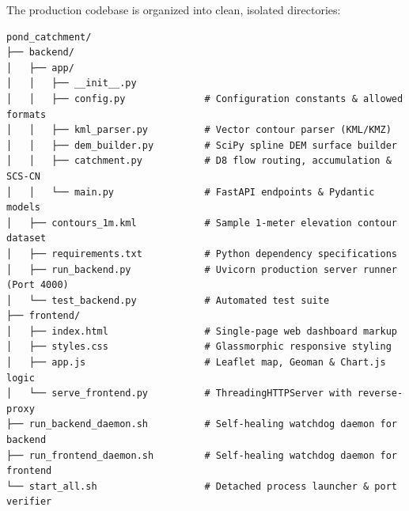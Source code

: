 \documentclass[11pt,a4paper]{article}
\begin{document}
The production codebase is organized into clean, isolated directories:
\begin{lstlisting}
pond_catchment/
├── backend/
│   ├── app/
│   │   ├── __init__.py
│   │   ├── config.py              # Configuration constants & allowed formats
│   │   ├── kml_parser.py          # Vector contour parser (KML/KMZ)
│   │   ├── dem_builder.py         # SciPy spline DEM surface builder
│   │   ├── catchment.py           # D8 flow routing, accumulation & SCS-CN
│   │   └── main.py                # FastAPI endpoints & Pydantic models
│   ├── contours_1m.kml            # Sample 1-meter elevation contour dataset
│   ├── requirements.txt           # Python dependency specifications
│   ├── run_backend.py             # Uvicorn production server runner (Port 4000)
│   └── test_backend.py            # Automated test suite
├── frontend/
│   ├── index.html                 # Single-page web dashboard markup
│   ├── styles.css                 # Glassmorphic responsive styling
│   ├── app.js                     # Leaflet map, Geoman & Chart.js logic
│   └── serve_frontend.py          # ThreadingHTTPServer with reverse-proxy
├── run_backend_daemon.sh          # Self-healing watchdog daemon for backend
├── run_frontend_daemon.sh         # Self-healing watchdog daemon for frontend
└── start_all.sh                   # Detached process launcher & port verifier
\end{lstlisting}
\end{document}
